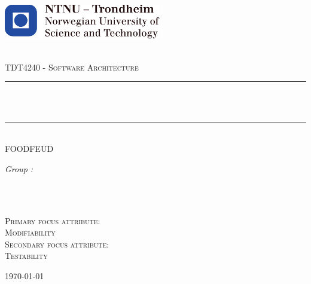\begin{titlepage}
\includegraphics[height=1.5cm]{images/ntnu_logo.pdf}\\[1cm]   
\begin{center}

 
~\\[1.5cm]

\textsc{\Large TDT4240 - Software Architecture}\\[0.5cm]

\hrule ~\\[0.2cm]
{\huge \bfseries \mytitle}\\[0.4cm]		%
\hrule ~\\[1.5cm]

\textsc{\Large FOODFEUD}\\[0.5cm]

\begin{minipage}{0.7\textwidth}
    \centering
	\large
		\emph{Group \mygroupnumber:}\\~\\
		\myauthor
\end{minipage}\\[0.5cm]



\begin{minipage}{0.4\textwidth}
    \centering
    \textsc{Primary focus attribute:\\Modifiability}\\[0.5cm]
    \textsc{Secondary focus attribute:\\Testability}\\[0.5cm]

\end{minipage}
\vfill
{\large \today}

\end{center}
\end{titlepage}